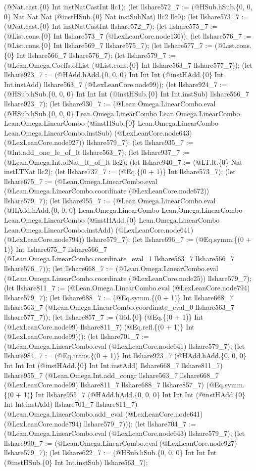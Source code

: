 \documentclass[11pt]{article}
\begin{document}
(@Nat.cast.\{0\} Int instNatCastInt llc1); (let llshare572\_7 := (@HSub.hSub.\{0, 0, 0\} Nat Nat Nat (@instHSub.\{0\} Nat instSubNat) llc2 llc0); (let llshare573\_7 := (@Nat.cast.\{0\} Int instNatCastInt llshare572\_7); (let llshare575\_7 := (@List.cons.\{0\} Int llshare573\_7 (@LexLeanCore.node136)); (let llshare576\_7 := (@List.cons.\{0\} Int llshare569\_7 llshare575\_7); (let llshare577\_7 := (@List.cons.\{0\} Int llshare566\_7 llshare576\_7); (let llshare579\_7 := (@Lean.Omega.Coeffs.ofList (@List.cons.\{0\} Int llshare563\_7 llshare577\_7)); (let llshare923\_7 := (@HAdd.hAdd.\{0, 0, 0\} Int Int Int (@instHAdd.\{0\} Int Int.instAdd) llshare563\_7 (@LexLeanCore.node99)); (let llshare924\_7 := (@HSub.hSub.\{0, 0, 0\} Int Int Int (@instHSub.\{0\} Int Int.instSub) llshare566\_7 llshare923\_7); (let llshare930\_7 := (@Lean.Omega.LinearCombo.eval (@HSub.hSub.\{0, 0, 0\} Lean.Omega.LinearCombo Lean.Omega.LinearCombo Lean.Omega.LinearCombo (@instHSub.\{0\} Lean.Omega.LinearCombo Lean.Omega.LinearCombo.instSub) (@LexLeanCore.node643) (@LexLeanCore.node927)) llshare579\_7); (let llshare935\_7 := (@Int.add\_one\_le\_of\_lt llshare563\_7); (let llshare937\_7 := (@Lean.Omega.Int.ofNat\_lt\_of\_lt llc2); (let llshare940\_7 := (@LT.lt.\{0\} Nat instLTNat llc2); (let llshare737\_7 := (@Eq.\{(0 + 1)\} Int llshare573\_7); (let llshare675\_7 := (@Lean.Omega.LinearCombo.eval (@Lean.Omega.LinearCombo.coordinate (@LexLeanCore.node672)) llshare579\_7); (let llshare955\_7 := (@Lean.Omega.LinearCombo.eval (@HAdd.hAdd.\{0, 0, 0\} Lean.Omega.LinearCombo Lean.Omega.LinearCombo Lean.Omega.LinearCombo (@instHAdd.\{0\} Lean.Omega.LinearCombo Lean.Omega.LinearCombo.instAdd) (@LexLeanCore.node641) (@LexLeanCore.node794)) llshare579\_7); (let llshare696\_7 := (@Eq.symm.\{(0 + 1)\} Int llshare675\_7 llshare566\_7 (@Lean.Omega.LinearCombo.coordinate\_eval\_1 llshare563\_7 llshare566\_7 llshare576\_7)); (let llshare668\_7 := (@Lean.Omega.LinearCombo.eval (@Lean.Omega.LinearCombo.coordinate (@LexLeanCore.node25)) llshare579\_7); (let llshare811\_7 := (@Lean.Omega.LinearCombo.eval (@LexLeanCore.node794) llshare579\_7); (let llshare688\_7 := (@Eq.symm.\{(0 + 1)\} Int llshare668\_7 llshare563\_7 (@Lean.Omega.LinearCombo.coordinate\_eval\_0 llshare563\_7 llshare577\_7)); (let llshare857\_7 := (@id.\{0\} (@Eq.\{(0 + 1)\} Int (@LexLeanCore.node99) llshare811\_7) (@Eq.refl.\{(0 + 1)\} Int (@LexLeanCore.node99))); (let llshare701\_7 := (@Lean.Omega.LinearCombo.eval (@LexLeanCore.node641) llshare579\_7); (let llshare984\_7 := (@Eq.trans.\{(0 + 1)\} Int llshare923\_7 (@HAdd.hAdd.\{0, 0, 0\} Int Int Int (@instHAdd.\{0\} Int Int.instAdd) llshare668\_7 llshare811\_7) llshare955\_7 (@Lean.Omega.Int.add\_congr llshare563\_7 llshare668\_7 (@LexLeanCore.node99) llshare811\_7 llshare688\_7 llshare857\_7) (@Eq.symm.\{(0 + 1)\} Int llshare955\_7 (@HAdd.hAdd.\{0, 0, 0\} Int Int Int (@instHAdd.\{0\} Int Int.instAdd) llshare701\_7 llshare811\_7) (@Lean.Omega.LinearCombo.add\_eval (@LexLeanCore.node641) (@LexLeanCore.node794) llshare579\_7))); (let llshare704\_7 := (@Lean.Omega.LinearCombo.eval (@LexLeanCore.node643) llshare579\_7); (let llshare990\_7 := (@Lean.Omega.LinearCombo.eval (@LexLeanCore.node927) llshare579\_7); (let llshare622\_7 := (@HSub.hSub.\{0, 0, 0\} Int Int Int (@instHSub.\{0\} Int Int.instSub) llshare563\_7); 
\end{document}
